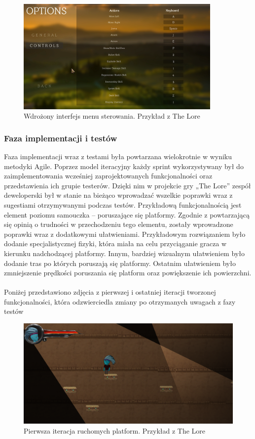 \documentclass[oneside,polski,logo]{amuthesis}
\begin{document}
\begin{figure}[h]
	\centering
	\includegraphics[width=10cm]{images/hyps/of2.png}
	\caption{Wdrożony interfejs menu sterowania. Przykład z The Lore}
\end{figure}

\subsubsection{Faza implementacji i testów}

Faza implementacji wraz z testami była powtarzana wielokrotnie w wyniku metodyki Agile. Poprzez model iteracyjny każdy sprint wykorzystywany był do zaimplementowania wcześniej zaprojektowanych funkcjonalności oraz przedstawienia ich grupie testerów. Dzięki nim w projekcie gry „The Lore” zespół deweloperski był w stanie na bieżąco wprowadzać wszelkie poprawki wraz z sugestiami otrzymywanymi podczas testów. Przykładową funkcjonalnością jest element poziomu samouczka – poruszające się platformy. Zgodnie z powtarzającą się opinią o trudności w przechodzeniu tego elementu, zostały wprowadzone poprawki wraz z dodatkowymi ułatwieniami. Przykładowym rozwiązaniem było dodanie specjalistycznej fizyki, która miała na celu przyciąganie gracza w kierunku nadchodzącej platformy. Innym, bardziej wizualnym ułatwieniem było dodanie tras po których poruszają się platformy. Ostatnim ułatwieniem było zmniejszenie prędkości poruszania się platform oraz powiększenie ich powierzchni. \\ \\ 
Poniżej przedstawiono zdjęcia z pierwszej i ostatniej iteracji tworzonej funkcjonalności, która odzwierciedla zmiany po otrzymanych uwagach z fazy testów\\

\begin{figure}[h]
	\centering
	\includegraphics[width=12cm]{images/hyps/platfBef.png}
	\caption{Pierwsza iteracja ruchomych platform. Przykład z The Lore}
\end{figure}
\end{document}
